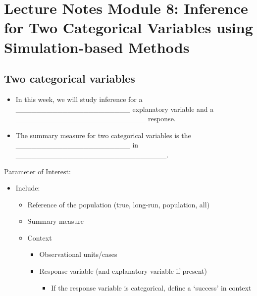 \documentclass[
]{report}
\providecommand{\tightlist}{%
  \setlength{\itemsep}{0pt}\setlength{\parskip}{0pt}}
\begin{document}
\hypertarget{lecture-notes-module-8-inference-for-two-categorical-variables-using-simulation-based-methods}{%
\section{Lecture Notes Module 8: Inference for Two Categorical Variables using Simulation-based Methods}\label{lecture-notes-module-8-inference-for-two-categorical-variables-using-simulation-based-methods}}


\hypertarget{two-categorical-variables}{%
\subsection*{Two categorical variables}\label{two-categorical-variables}}


\begin{itemize}
\item
  In this week, we will study inference for a \_\_\_\_\_\_\_\_\_\_\_\_\_\_\_\_\_\_\_\_\_\_ explanatory variable and a \_\_\_\_\_\_\_\_\_\_\_\_\_\_\_\_\_\_\_\_\_\_\_\_\_ response.
\item
  The summary measure for two categorical variables is the \_\_\_\_\_\_\_\_\_\_\_\_\_\_\_\_\_\_\_\_\_\_ in \_\_\_\_\_\_\_\_\_\_\_\_\_\_\_\_\_\_\_\_\_\_\_\_\_\_\_\_\_.
\end{itemize}


Parameter of Interest:

\begin{itemize}
\item
  Include:

  \begin{itemize}
  \item
    Reference of the population (true, long-run, population, all)
  \item
    Summary measure
  \item
    Context

    \begin{itemize}
    \item
      Observational units/cases
    \item
      Response variable (and explanatory variable if present)

      \begin{itemize}
      \tightlist
      \item
        If the response variable is categorical, define a `success' in context
      \end{itemize}
    \end{itemize}
  \end{itemize}
\end{itemize}
\end{document}
